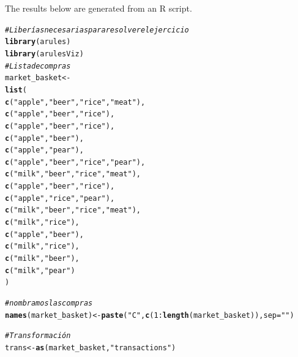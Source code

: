 \documentclass{article}\usepackage[]{graphicx}\usepackage[]{xcolor}
\makeatletter
\newcommand{\hlnum}[1]{\textcolor[rgb]{0.686,0.059,0.569}{#1}}%
\newcommand{\hlstr}[1]{\textcolor[rgb]{0.192,0.494,0.8}{#1}}%
\newcommand{\hlcom}[1]{\textcolor[rgb]{0.678,0.584,0.686}{\textit{#1}}}%
\newcommand{\hlopt}[1]{\textcolor[rgb]{0,0,0}{#1}}%
\newcommand{\hlstd}[1]{\textcolor[rgb]{0.345,0.345,0.345}{#1}}%
\newcommand{\hlkwb}[1]{\textcolor[rgb]{0.69,0.353,0.396}{#1}}%
\newcommand{\hlkwc}[1]{\textcolor[rgb]{0.333,0.667,0.333}{#1}}%
\newcommand{\hlkwd}[1]{\textcolor[rgb]{0.737,0.353,0.396}{\textbf{#1}}}%
\newenvironment{kframe}{%
 \def\at@end@of@kframe{}%
 \ifinner\ifhmode%
  \def\at@end@of@kframe{\end{minipage}}%
  \begin{minipage}{\columnwidth}%
 \fi\fi%
 \def\FrameCommand##1{\hskip\@totalleftmargin \hskip-\fboxsep
 \colorbox{shadecolor}{##1}\hskip-\fboxsep
     \hskip-\linewidth \hskip-\@totalleftmargin \hskip\columnwidth}%
 \MakeFramed {\advance\hsize-\width
   \@totalleftmargin\z@ \linewidth\hsize
   \@setminipage}}%
 {\par\unskip\endMakeFramed%
 \at@end@of@kframe}
\newenvironment{knitrout}{}{} %
\makeatother
\begin{document}
\title{\title{\title{\title{\title{\title{\title{\title{\title{}}}}}}}}}



\maketitle
The results below are generated from an R script.

\begin{knitrout}
\color{fgcolor}\begin{kframe}
\begin{alltt}
\hlcom{# Liberías necesarias para resolver el ejercicio}
\hlkwd{library}\hlstd{(arules)}
\hlkwd{library}\hlstd{(arulesViz)}
\hlcom{# Lista de compras}
\hlstd{market_basket} \hlkwb{<-}
  \hlkwd{list}\hlstd{(}
    \hlkwd{c}\hlstd{(}\hlstr{"apple"}\hlstd{,} \hlstr{"beer"}\hlstd{,} \hlstr{"rice"}\hlstd{,} \hlstr{"meat"}\hlstd{),}
    \hlkwd{c}\hlstd{(}\hlstr{"apple"}\hlstd{,} \hlstr{"beer"}\hlstd{,} \hlstr{"rice"}\hlstd{),}
    \hlkwd{c}\hlstd{(}\hlstr{"apple"}\hlstd{,} \hlstr{"beer"}\hlstd{,} \hlstr{"rice"}\hlstd{),}
    \hlkwd{c}\hlstd{(}\hlstr{"apple"}\hlstd{,} \hlstr{"beer"}\hlstd{),}
    \hlkwd{c}\hlstd{(}\hlstr{"apple"}\hlstd{,} \hlstr{"pear"}\hlstd{),}
    \hlkwd{c}\hlstd{(}\hlstr{"apple"}\hlstd{,} \hlstr{"beer"}\hlstd{,} \hlstr{"rice"}\hlstd{,} \hlstr{"pear"}\hlstd{),}
    \hlkwd{c}\hlstd{(}\hlstr{"milk"}\hlstd{,} \hlstr{"beer"}\hlstd{,} \hlstr{"rice"}\hlstd{,} \hlstr{"meat"}\hlstd{),}
    \hlkwd{c}\hlstd{(}\hlstr{"apple"}\hlstd{,} \hlstr{"beer"}\hlstd{,} \hlstr{"rice"}\hlstd{),}
    \hlkwd{c}\hlstd{(}\hlstr{"apple"}\hlstd{,} \hlstr{"rice"}\hlstd{,} \hlstr{"pear"}\hlstd{),}
    \hlkwd{c}\hlstd{(}\hlstr{"milk"}\hlstd{,} \hlstr{"beer"}\hlstd{,} \hlstr{"rice"}\hlstd{,} \hlstr{"meat"}\hlstd{),}
    \hlkwd{c}\hlstd{(}\hlstr{"milk"}\hlstd{,} \hlstr{"rice"}\hlstd{),}
    \hlkwd{c}\hlstd{(}\hlstr{"apple"}\hlstd{,} \hlstr{"beer"}\hlstd{),}
    \hlkwd{c}\hlstd{(}\hlstr{"milk"}\hlstd{,} \hlstr{"rice"}\hlstd{),}
    \hlkwd{c}\hlstd{(}\hlstr{"milk"}\hlstd{,} \hlstr{"beer"}\hlstd{),}
    \hlkwd{c}\hlstd{(}\hlstr{"milk"}\hlstd{,} \hlstr{"pear"}\hlstd{)}
  \hlstd{)}

\hlcom{# nombramos las compras }
\hlkwd{names}\hlstd{(market_basket)} \hlkwb{<-} \hlkwd{paste}\hlstd{(}\hlstr{"C"}\hlstd{,} \hlkwd{c}\hlstd{(}\hlnum{1}\hlopt{:}\hlkwd{length}\hlstd{(market_basket)),} \hlkwc{sep} \hlstd{=} \hlstr{""}\hlstd{)}

\hlcom{# Transformación}
\hlstd{trans} \hlkwb{<-} \hlkwd{as}\hlstd{(market_basket,} \hlstr{"transactions"}\hlstd{)}


\end{alltt}
\end{kframe}
\end{knitrout}
\end{document}
